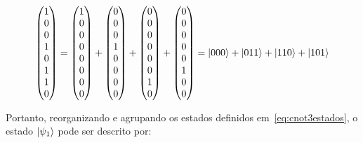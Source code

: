 \begin{equation}
	\begin{split}
	\begin{pmatrix}
	1 \\
	0 \\
	0 \\
	1 \\
	0 \\
	1 \\
	1 \\
	0
	\end{pmatrix} = \begin{pmatrix}
	1 \\
	0 \\
	0 \\
	0 \\
	0 \\
	0 \\
	0 \\
	0
	\end{pmatrix} + \begin{pmatrix}
	0 \\
	0 \\
	0 \\
	1 \\
	0 \\
	0 \\
	0 \\
	0
	\end{pmatrix} + \begin{pmatrix}
	0 \\
	0 \\
	0 \\
	0 \\
	0 \\
	0 \\
	1 \\
	0
	\end{pmatrix} + \begin{pmatrix}
	0 \\
	0 \\
	0 \\
	0 \\
	0 \\
	1 \\
	0 \\
	0
	\end{pmatrix} = \ket{000}+\ket{011}+\ket{110}+\ket{101}
	\end{split}
\end{equation}

Portanto, reorganizando e agrupando os estados definidos em~\eqref{eq:cnot3estados}, o estado $\ket{\psi_1}$ pode ser descrito por:
 

